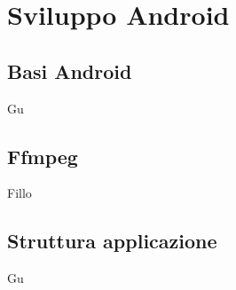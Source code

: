 \chapter{Sviluppo Android}

\section{Basi Android}
Gu


\section{Ffmpeg}
Fillo


\section{Struttura applicazione}
Gu
